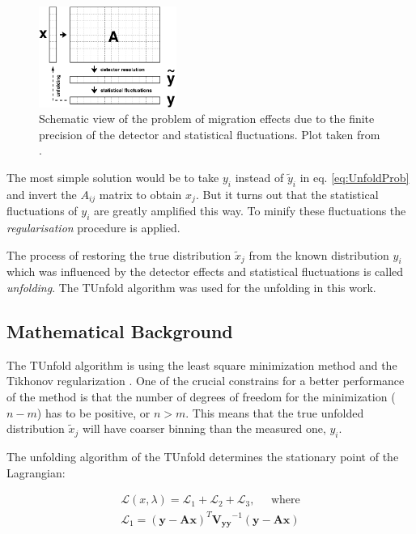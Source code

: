 \begin{figure}[t]
  \centering
  \includegraphics[width=0.4\textwidth]{06_DiffXsec/plots/d12-129f1.png}
  \caption{Schematic view of the problem of migration effects due to the finite precision of the detector and statistical 
  fluctuations. Plot taken from \cite{Schmitt:2012kp}.}
  \label{fig:scUnf}
\end{figure}

The most simple solution would be to take $y_{i}$ instead of $\tilde{y}_{i}$ in eq. \ref{eq:UnfoldProb} and invert
the $A_{ij}$ matrix to obtain $x_{j}$. But it turns out that the statistical fluctuations of $y_{i}$ are greatly 
amplified this way. To minify these fluctuations the \textit{regularisation} procedure is applied.

The process of restoring the true distribution $\tilde{x}_{j}$ from the known distribution $y_{i}$ which was influenced
by the detector effects and statistical fluctuations is called \textit{unfolding}. The TUnfold \cite{Schmitt:2012k} algorithm was used for the
unfolding in this work.

\subsection{Mathematical Background}

The TUnfold algorithm is using the least square minimization method and the Tikhonov regularization \cite{Tikhonov:1963}. One of the crucial 
constrains for a better performance of the method is that the number of degrees of freedom for the minimization ($n - m$) has to be positive,
or $n > m$. This means that the true unfolded distribution $\tilde{x}_j$ will have coarser binning than the measured one, $y_{i}$.

The unfolding algorithm of the TUnfold determines the stationary point of the Lagrangian:

\begin{align}
 \mathcal{L}(x, \lambda) = \mathcal{L}_{1} + \mathcal{L}_{2} + \mathcal{L}_{3}, \;\;\;\;\; \textrm{where}\\
 \mathcal{L}_{1} = (\mathbf{y} - \mathbf{A}\mathbf{x})^{T} \mathbf{V_{yy}}^{-1}(\mathbf{y} - \mathbf{A}\mathbf{x})
\end{align}


